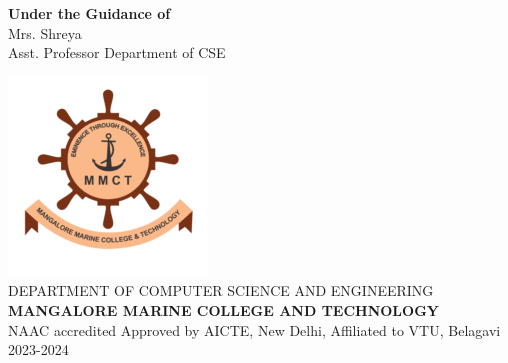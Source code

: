 \documentclass[12pt, a4paper]{report} %
\begin{document}
\begin{titlepage}
\begin{center}
			\vspace{0.2in}
			
			\textbf{Under the Guidance of}\\
			Mrs. Shreya\\
			Asst. Professor Department of CSE\\
			
			\vspace{0.2in}
			
			\includegraphics[scale=0.4]{images/mmct.png}\\
			\vspace{0.01in}
			{\small DEPARTMENT OF COMPUTER SCIENCE AND ENGINEERING}\\
			\vspace{0.1in}
			\textbf{MANGALORE MARINE COLLEGE AND TECHNOLOGY}\\
			{\small NAAC accredited Approved by AICTE, New Delhi, Affiliated to VTU, Belagavi}\\
			\vspace{0.1in}
			{\small 2023-2024}\\
			
		\end{center} %
	\end{titlepage} %
	
\end{document}

